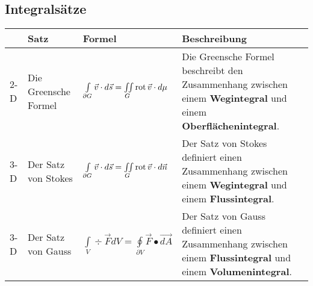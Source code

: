 \subsection{Integralsätze}
	\begin{tabular}{|p{0.4cm}||p{4cm}|p{5.7cm}|p{7cm}|}
	\hline
	& \textbf{Satz} & \textbf{Formel} & \textbf{Beschreibung}\\
	\hline
	\hline
	\begin{sideways}2-D \qquad \end{sideways} &
  	Die Greensche Formel &
	\begin{minipage}{6.7cm}
	    \vspace{0.1cm}
		$\int\limits_{\partial G}\vec{v}\cdot d\vec{s}=\iint\limits_G \operatorname{rot}
		\vec{v}\cdot d\mu$	 		    
	    \vspace{0.1cm}   
    \end{minipage}&
	\begin{minipage}{7cm}
	    \vspace{0.1cm}
		Die Greensche Formel beschreibt den Zusammenhang zwischen einem
		\textbf{Wegintegral} und einem \textbf{Oberflächenintegral}.
	    \vspace{0.1cm}   
    \end{minipage}\\
	\hline
	\begin{sideways}3-D \qquad \end{sideways} &
	Der Satz von Stokes &
	\begin{minipage}{6.7cm}
    	\vspace{0.1cm}
		$\int\limits_{\partial G}\vec{v}\cdot d\vec{s}=\iint\limits_G \operatorname{rot}
		\vec{v}\cdot d\vec{n}$		 
		\vspace{0.1cm} 
    \end{minipage}&
	\begin{minipage}{7cm}
    	\vspace{0.1cm}
		Der Satz von Stokes definiert einen Zusammenhang zwischen einem
		\textbf{Wegintegral} und einem \textbf{Flussintegral}.	    
	    \vspace{0.1cm}   
    \end{minipage}\\
	\hline
	\begin{sideways}3-D \qquad \end{sideways} &
	Der Satz von Gauss  &
	\begin{minipage}{6.7cm}
	    \vspace{0.1cm}
		$\int\limits_V \div\vec F dV = \oint\limits_{\partial V} \vec F \bullet \vec{dA}$			    
	    \vspace{0.1cm}   
    \end{minipage}&
	\begin{minipage}{7cm}
    	\vspace{0.1cm}
		Der Satz von Gauss definiert einen Zusammenhang zwischen einem
		\textbf{Flussintegral} und einem \textbf{Volumenintegral}.	    
	    \vspace{0.1cm}    
    \end{minipage}\\
	\hline	
\end{tabular}

